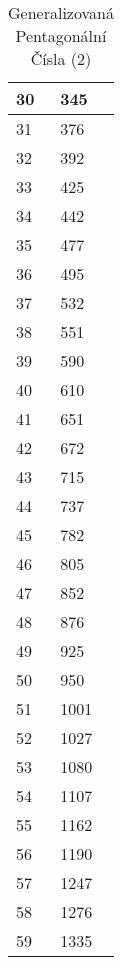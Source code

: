 \documentclass[11pt]{article}
\begin{document}
\begin{table}[H]
\centering
\caption{Generalizovaná Pentagonální Čísla (2)}
\begin{tabular}{|l|l|}
\hline
30&345\\\hline
31&376\\\hline
32&392\\\hline
33&425\\\hline
34&442\\\hline
35&477\\\hline
36&495\\\hline
37&532\\\hline
38&551\\\hline
39&590\\\hline
40&610\\\hline
41&651\\\hline
42&672\\\hline
43&715\\\hline
44&737\\\hline
45&782\\\hline
46&805\\\hline
47&852\\\hline
48&876\\\hline
49&925\\\hline
50&950\\\hline
51&1001\\\hline
52&1027\\\hline
53&1080\\\hline
54&1107\\\hline
55&1162\\\hline
56&1190\\\hline
57&1247\\\hline
58&1276\\\hline
59&1335\\\hline
\end{tabular}
\end{table}
\end{document}
